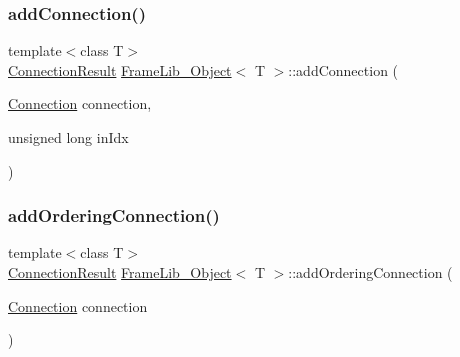 \subsubsection{\texorpdfstring{add\+Connection()}{addConnection()}}
{\footnotesize\ttfamily template$<$class T$>$ \\
\hyperlink{_frame_lib___types_8h_a2a427ca8c6f961bac8e41f6edecf0722}{Connection\+Result} \hyperlink{class_frame_lib___object}{Frame\+Lib\+\_\+\+Object}$<$ T $>$\+::add\+Connection (\begin{DoxyParamCaption}\item[{\hyperlink{struct_frame_lib___object_1_1_connection}{Connection}}]{connection,  }\item[{unsigned long}]{in\+Idx }\end{DoxyParamCaption})\hspace{0.3cm}{\ttfamily [inline]}}

\mbox{\label{class_frame_lib___object_aaa1ec62334620a049632f72ad2c22538}} 
\subsubsection{\texorpdfstring{add\+Ordering\+Connection()}{addOrderingConnection()}}
{\footnotesize\ttfamily template$<$class T$>$ \\
\hyperlink{_frame_lib___types_8h_a2a427ca8c6f961bac8e41f6edecf0722}{Connection\+Result} \hyperlink{class_frame_lib___object}{Frame\+Lib\+\_\+\+Object}$<$ T $>$\+::add\+Ordering\+Connection (\begin{DoxyParamCaption}\item[{\hyperlink{struct_frame_lib___object_1_1_connection}{Connection}}]{connection }\end{DoxyParamCaption})\hspace{0.3cm}{\ttfamily [inline]}}

\mbox{\label{class_frame_lib___object_a9b2213d1010d13c7c79de5d5f053ea1b}} 
